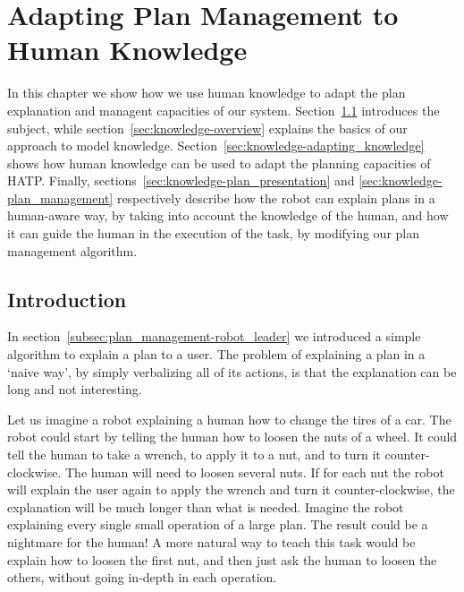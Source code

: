 \chapter{Adapting Plan Management to Human Knowledge} %

\label{chapter:knowledge} %



  
In this chapter we show how we use human knowledge to adapt the plan explanation and managent capacities of our system. Section~\ref{sec:knowledge-intro} introduces the subject, while section~\ref{sec:knowledge-overview} explains the basics of our approach to model knowledge. Section~\ref{sec:knowledge-adapting_knowledge} shows how human knowledge can be used to adapt the planning capacities of HATP. Finally, sections~\ref{sec:knowledge-plan_presentation} and \ref{sec:knowledge-plan_management} respectively describe how the robot can explain plans in a human-aware way, by taking into account the knowledge of the human, and how it can guide the human in the execution of the task, by modifying our plan management algorithm.


\section{Introduction}
\label{sec:knowledge-intro}

In section~\ref{subsec:plan_management-robot_leader} we introduced a simple algorithm to explain a plan to a user. The problem of explaining a plan in a `naive way', by simply verbalizing all of its actions, is that the explanation can be long and not interesting. 

Let us imagine a robot explaining a human how to change the tires of a car. The robot could start by telling the human how to loosen the nuts of a wheel. It could tell the human to take a wrench, to apply it to a nut, and to turn it counter-clockwise. The human will need to loosen several nuts. If for each nut the robot will explain the user again to apply the wrench and turn it counter-clockwise, the explanation will be much longer than what is needed. Imagine the robot explaining every single small operation of a large plan. The result could be a nightmare for the human! A more natural way to teach this task would be explain how to loosen the first nut, and then just ask the human to loosen the others, without going in-depth in each operation.

